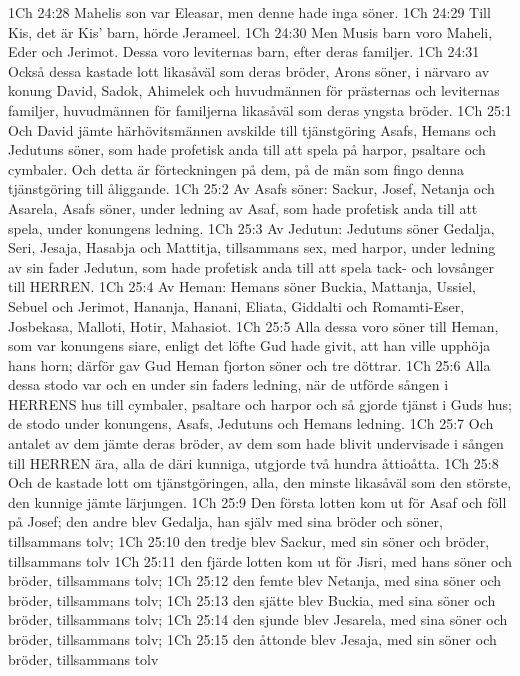 1Ch 24:28  Mahelis son var Eleasar, men denne hade inga söner.
1Ch 24:29  Till Kis, det är Kis' barn, hörde Jerameel.
1Ch 24:30  Men Musis barn voro Maheli, Eder och Jerimot. Dessa voro leviternas barn, efter deras familjer.
1Ch 24:31  Också dessa kastade lott likasåväl som deras bröder, Arons söner, i närvaro av konung David, Sadok, Ahimelek och huvudmännen för prästernas och leviternas familjer, huvudmännen för familjerna likasåväl som deras yngsta bröder.
1Ch 25:1  Och David jämte härhövitsmännen avskilde till tjänstgöring Asafs, Hemans och Jedutuns söner, som hade profetisk anda till att spela på harpor, psaltare och cymbaler. Och detta är förteckningen på dem, på de män som fingo denna tjänstgöring till åliggande.
1Ch 25:2  Av Asafs söner: Sackur, Josef, Netanja och Asarela, Asafs söner, under ledning av Asaf, som hade profetisk anda till att spela, under konungens ledning.
1Ch 25:3  Av Jedutun: Jedutuns söner Gedalja, Seri, Jesaja, Hasabja och Mattitja, tillsammans sex, med harpor, under ledning av sin fader Jedutun, som hade profetisk anda till att spela tack- och lovsånger till HERREN.
1Ch 25:4  Av Heman: Hemans söner Buckia, Mattanja, Ussiel, Sebuel och Jerimot, Hananja, Hanani, Eliata, Giddalti och Romamti-Eser, Josbekasa, Malloti, Hotir, Mahasiot.
1Ch 25:5  Alla dessa voro söner till Heman, som var konungens siare, enligt det löfte Gud hade givit, att han ville upphöja hans horn; därför gav Gud Heman fjorton söner och tre döttrar.
1Ch 25:6  Alla dessa stodo var och en under sin faders ledning, när de utförde sången i HERRENS hus till cymbaler, psaltare och harpor och så gjorde tjänst i Guds hus; de stodo under konungens, Asafs, Jedutuns och Hemans ledning.
1Ch 25:7  Och antalet av dem jämte deras bröder, av dem som hade blivit undervisade i sången till HERREN ära, alla de däri kunniga, utgjorde två hundra åttioåtta.
1Ch 25:8  Och de kastade lott om tjänstgöringen, alla, den minste likasåväl som den störste, den kunnige jämte lärjungen.
1Ch 25:9  Den första lotten kom ut för Asaf och föll på Josef; den andre blev Gedalja, han själv med sina bröder och söner, tillsammans tolv;
1Ch 25:10  den tredje blev Sackur, med sin söner och bröder, tillsammans tolv
1Ch 25:11  den fjärde lotten kom ut för Jisri, med hans söner och bröder, tillsammans tolv;
1Ch 25:12  den femte blev Netanja, med sina söner och bröder, tillsammans tolv;
1Ch 25:13  den sjätte blev Buckia, med sina söner och bröder, tillsammans tolv;
1Ch 25:14  den sjunde blev Jesarela, med sina söner och bröder, tillsammans tolv;
1Ch 25:15  den åttonde blev Jesaja, med sin söner och bröder, tillsammans tolv
